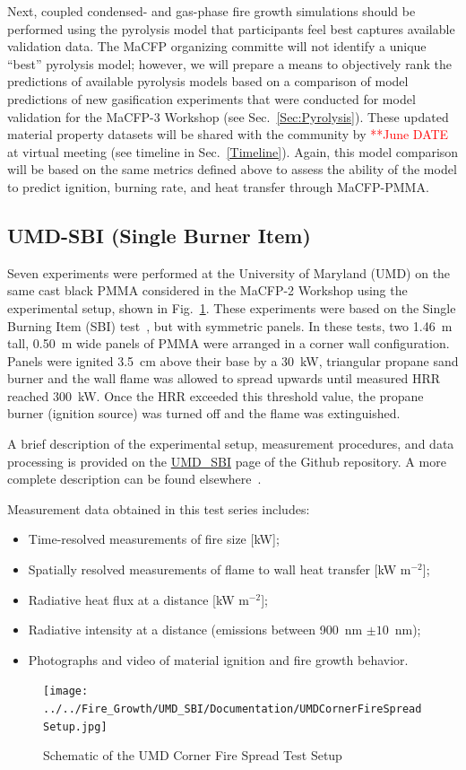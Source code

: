 \documentclass[12pt]{article}
\begin{document}
Next, coupled condensed- and gas-phase fire growth simulations should be performed using the pyrolysis model that participants feel best captures available validation data. The MaCFP organizing committe will not identify a unique ``best'' pyrolysis model; however, we will prepare a means to objectively rank the predictions of available pyrolysis models based on a comparison of model predictions of new gasification experiments that were conducted for model validation for the MaCFP-3 Workshop (see Sec.~\ref{Sec:Pyrolysis}). These updated material property datasets will be shared with the community by \textcolor{red}{**June DATE} at virtual meeting (see timeline in Sec.~\ref{Timeline}). Again, this model comparison will be based on the same metrics defined above to assess the ability of the model to predict ignition, burning rate, and heat transfer through MaCFP-PMMA. 

\subsection {UMD-SBI (Single Burner Item)}
Seven experiments were performed at the University of Maryland (UMD) on the same cast black PMMA considered in the MaCFP-2 Workshop using the experimental setup, shown in Fig.~\ref{fig:UMDCornerFireSpreadSetup}. These experiments were based on the Single Burning Item (SBI) test~\cite{EN-13823standard}, but with symmetric panels. In these tests, two 1.46~m tall, 0.50~m wide panels of PMMA were arranged in a corner wall configuration. Panels were ignited 3.5~cm above their base by a 30~kW, triangular propane sand burner and the wall flame was allowed to spread upwards until measured HRR reached 300~kW. Once the HRR exceeded this threshold value, the propane burner (ignition source) was turned off and the flame was extinguished.

A brief description of the experimental setup, measurement procedures, and data processing is provided on the \href{https://github.com/MaCFP/macfp-db/tree/master/Fire_Growth/UMD_SBI}{UMD\_SBI} page of the Github repository. A more complete description can be found elsewhere~\cite{chaudhari2021experimental}.

Measurement data obtained in this test series includes:
\begin{itemize}[noitemsep]
\item Time-resolved measurements of fire size [kW];
\item Spatially resolved measurements of flame to wall heat transfer [kW m$^{-2}$];
\item Radiative heat flux at a distance [kW m$^{-2}$]; 
\item Radiative intensity at a distance (emissions between 900~nm $\pm10$~nm); 
\item Photographs and video of material ignition and fire growth behavior.
\end{itemize}
\begin{figure}
     \centering
         \texttt{[image: ../../Fire\_Growth/UMD\_SBI/Documentation/UMDCornerFireSpreadSetup.jpg]}
         \caption{Schematic of the UMD Corner Fire Spread Test Setup}
         \label{fig:UMDCornerFireSpreadSetup}
\end{figure}
\end{document}

